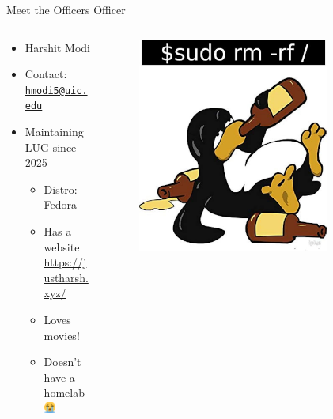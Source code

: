 \documentclass{beamer}
\begin{document}
\begin{frame}{Meet the Officers}
	{\Huge Officer}
	\begin{columns}
		\begin{column}{0.5\textwidth}
			\begin{itemize}
				\item {\Large Harshit Modi}
				\item Contact:
					\href{mailto:hmodi5@uic.edu}{\texttt{hmodi5@uic.edu}}
				\item Maintaining LUG since 2025
				\begin{itemize}
					\item Distro: Fedora
					\item Has a website
						\url{https://justharsh.xyz/}
					\item Loves movies!
					\item Doesn't have a homelab \includegraphics[width=1em]{cry_emoji.png}
				\end{itemize}
			\end{itemize}
		\end{column}
		\begin{column}{0.5\textwidth}
			\begin{figure}
				\centering
				\includegraphics[width=0.8\textwidth]{drunk_tux.jpg}
			\end{figure}
		\end{column}
	\end{columns}
\end{frame}
\end{document}

